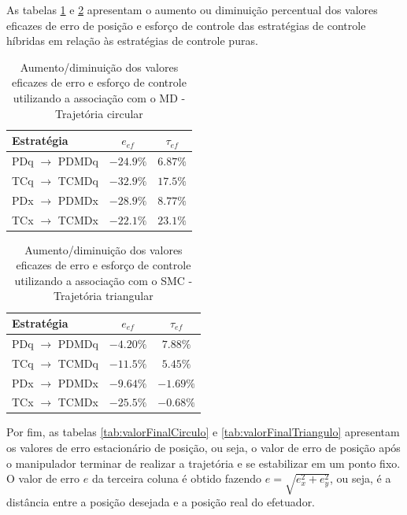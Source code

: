 \documentclass[]{politex}
\begin{document}
As tabelas \ref{tab:valoresEficazesCombCirculo} e \ref{tab:valoresEficazesCombTriangulo} apresentam o aumento ou diminuição percentual dos valores eficazes de erro de posição e esforço de controle das estratégias de controle híbridas em relação às estratégias de controle puras.

\begin{table}[H] 
\centering
\caption{Aumento/diminuição dos valores eficazes de erro e esforço de controle utilizando a associação com o MD - Trajetória circular}
\label{tab:valoresEficazesCombCirculo}
\begin{tabular}{l|c|c}
Estratégia              & $e_{ef}$  & $\tau_{ef} $ \\ \hline
PDq $\rightarrow$ PDMDq & $-24.9\%$ & $6.87\%$               \\
TCq $\rightarrow$ TCMDq & $-32.9\%$ & $17.5\%$               \\
PDx $\rightarrow$ PDMDx & $-28.9\%$ & $8.77\%$               \\
TCx $\rightarrow$ TCMDx & $-22.1\%$ & $23.1\%$               \\
\end{tabular}
\end{table}

\begin{table}[H] 
\centering
\caption{Aumento/diminuição dos valores eficazes de erro e esforço de controle utilizando a associação com o SMC - Trajetória triangular}
\label{tab:valoresEficazesCombTriangulo}
\begin{tabular}{l|c|c}
Estratégia              & $e_{ef}$          & $\tau_{ef} $ \\ \hline
PDq $\rightarrow$ PDMDq & $-4.20\%$         & $7.88\%$               \\
TCq $\rightarrow$ TCMDq & $-11.5\%$         & $5.45\%$               \\
PDx $\rightarrow$ PDMDx & $-9.64\%$         & $-1.69\%$               \\
TCx $\rightarrow$ TCMDx & $-25.5\%$         & $-0.68\%$               \\
\end{tabular}
\end{table}

Por fim, as tabelas \ref{tab:valorFinalCirculo} e \ref{tab:valorFinalTriangulo} apresentam os valores de erro estacionário de posição, ou seja, o valor de erro de posição após o manipulador terminar de realizar a trajetória e se estabilizar em um ponto fixo. O valor de erro $e$ da terceira coluna é obtido fazendo $e = \sqrt{e_x^2 + e_y^2}$, ou seja, é a distância entre a posição desejada e a posição real do efetuador.
\end{document}
